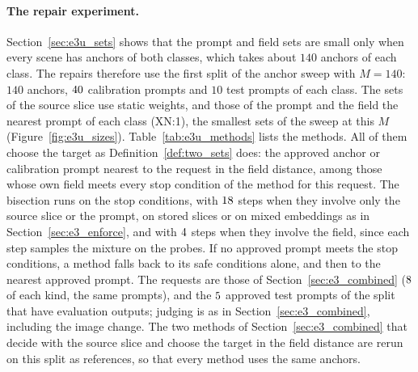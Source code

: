 \documentclass{article}
\theoremstyle{plain}
\theoremstyle{remark}
\begin{document}
\paragraph{The repair experiment.}
Section~\ref{sec:e3u_sets} shows that the prompt and field sets are small only when every scene has anchors of both classes, which takes
about $140$ anchors of each class. The repairs therefore use the first split of the anchor sweep with $M=140$: $140$ anchors, $40$
calibration prompts and $10$ test prompts of each class. The sets of the source slice use static weights, and those of the prompt and the
field the nearest prompt of each class (XN:1), the smallest sets of the sweep at this $M$ (Figure~\ref{fig:e3u_sizes}).
Table~\ref{tab:e3u_methods} lists the methods. All of them choose the target as Definition~\ref{def:two_sets} does: the approved anchor
or calibration prompt nearest to the request in the field distance, among those whose own field meets every stop condition of the
method for this request. The bisection runs on the stop conditions, with $18$ steps when they involve only the source slice or
the prompt, on stored slices or on mixed embeddings as in Section~\ref{sec:e3_enforce}, and with $4$ steps when they involve
the field, since each step samples the mixture on the probes. If no approved prompt meets the stop conditions, a method falls back to its
safe conditions alone, and then to the nearest approved prompt. The requests are those of Section~\ref{sec:e3_combined} ($8$
of each kind, the same prompts), and the $5$ approved test prompts of the split that have evaluation outputs; judging is as in
Section~\ref{sec:e3_combined}, including the image change. The two methods of Section~\ref{sec:e3_combined} that decide with the source
slice and choose the target in the field distance are rerun on this split as references, so that every method uses the same anchors.
\end{document}
